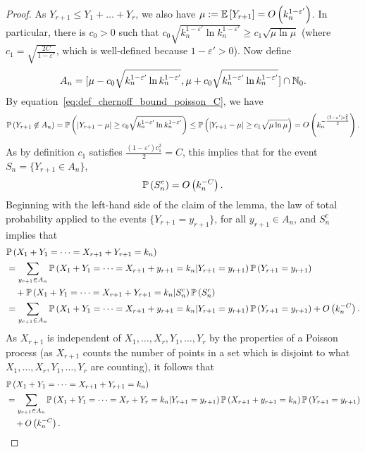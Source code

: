 \begin{proof}
As $Y_{r+1} \leq Y_1+\dots+Y_r$, we also have $\mu:=\mathbb{E}\left[Y_{r+1}\right] = O\left(k_n^{1-\varepsilon'}\right)$. In particular, there is $c_0>0$ such that $c_0\sqrt{k_n^{1-\varepsilon'}\ln k_n^{1-\varepsilon'}}\geq c_1\sqrt{\mu\ln\mu}$ (where $c_1=\sqrt{\frac{2C}{1-\varepsilon'}}$, which is well-defined because $1-\varepsilon'>0$). Now define
\begin{align*}
A_n=[\mu-c_0\sqrt{k_n^{1-\varepsilon'}\ln k_n^{1-\varepsilon'}},\mu+c_0\sqrt{k_n^{1-\varepsilon'}\ln k_n^{1-\varepsilon'}}]\cap \N_0.%
\end{align*}
By equation~\eqref{eq:def_chernoff_bound_poisson_C}, we have
\begin{align*}
	\mathbb{P}\left(Y_{r+1} \not \in A_n\right) 
	= \mathbb{P}\left(|Y_{r+1}-\mu|\geq c_0\sqrt{k_n^{1-\varepsilon'}\ln k_n^{1-\varepsilon'}}\right)
	\le \mathbb{P}\left(|Y_{r+1}-\mu|\geq c_1\sqrt{\mu\ln\mu}\right)
	=O\left(k_n^{-\frac{(1-\varepsilon')c_1^2}{2}}\right).
\end{align*}
As by definition $c_1$ satisfies $\frac{(1-\varepsilon')c_1^2}{2}=C$, this implies that for the event $S_n = \{Y_{r+1}\in A_n\}$,
\[
	\mathbb{P}\left(S_n^c\right)=O\left(k_n^{-C}\right).
\]
Beginning with the left-hand side of the claim of the lemma, the law of total probability applied to the events $\{Y_{r+1}=y_{r+1}\}$, for all $y_{r+1}\in A_n$, and $S_n^c$ implies that
\begin{align*}
	&\mathbb{P}\left(X_1+Y_1=\dots=X_{r+1}+Y_{r+1}=k_n\right) \\
	&=\sum_{y_{r+1}\in A_n} \mathbb{P}\left(X_1+Y_1=\dots=X_{r+1}+y_{r+1}=k_n|Y_{r+1}=y_{r+1}\right)\mathbb{P}\left(Y_{r+1}=y_{r+1}\right)\\ 
	&\hspace{10pt}+ \mathbb{P}\left(X_1+Y_1=\dots=X_{r+1}+Y_{r+1}=k_n|S_n^c\right) \mathbb{P}\left(S_n^c\right)\\
	&=\sum_{y_{r+1}\in A_n} \mathbb{P}\left(X_1+Y_1=\dots=X_{r+1}+y_{r+1}=k_n|Y_{r+1}=y_{r+1}\right) 
		\mathbb{P}\left(Y_{r+1}=y_{r+1}\right)+O\left(k_n^{-C}\right).
\end{align*}
As $X_{r+1}$ is independent of $X_1, \dots, X_r, Y_1, \dots, Y_r$ by the properties of a Poisson process (as $X_{r+1}$ counts the number of points in a set which is disjoint to what $X_1,\dots,X_r, Y_1, \dots, Y_r$ are counting), it follows that
\begin{align*}%
	&\Prob{X_1+Y_1=\dots=X_{r+1}+Y_{r+1}=k_n} \\
	&=\sum_{y_{r+1} \in A_n} \Prob{X_1+Y_1=\dots=X_{r}+Y_r=k_n|Y_{r+1}=y_{r+1}}
		\Prob{X_{r+1}+y_{r+1}=k_n} \Prob{Y_{r+1}=y_{r+1}}\\
	&\hspace{10pt} +\bigO{k_n^{-C}}.

\end{align*}
\end{proof}
